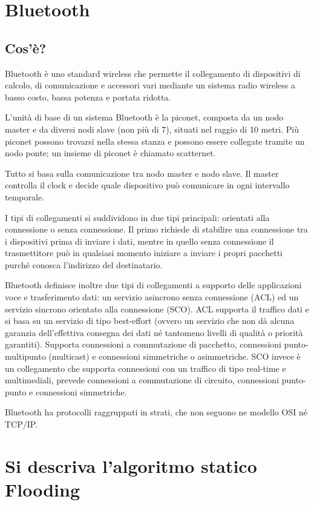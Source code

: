 \section{Bluetooth}
\subsection{Cos'è?}
Bluetooth è uno standard wireless che permette il collegamento di dispositivi di calcolo, di comunicazione e accessori vari mediante un sistema radio wireless a basso costo, bassa potenza e portata ridotta.

L'unità di base di un sistema Bluetooth è la piconet, composta da un nodo master e da diversi nodi slave (non più di 7), situati nel raggio di 10 metri. Più piconet possono trovarsi nella stessa stanza e possono essere collegate tramite un nodo ponte; un insieme di piconet è chiamato scatternet.

Tutto si basa sulla comunicazione tra nodo master e nodo slave. Il master controlla il clock e decide quale dispositivo può comunicare in ogni intervallo temporale.

I tipi di collegamenti si suddividono in due tipi principali: orientati alla connessione o senza connessione.
Il primo richiede di stabilire una connessione tra i dispositivi prima di inviare i dati, mentre in quello senza connessione il trasmettitore può in qualsiasi momento iniziare a inviare i propri pacchetti purché conosca l'indirizzo del destinatario.

Bluetooth definisce inoltre due tipi di collegamenti a supporto delle applicazioni voce e trasferimento dati: un servizio asincrono senza connessione (ACL) ed un servizio sincrono orientato alla connessione (SCO).
ACL supporta il traffico dati e si basa su un servizio di tipo best-effort (ovvero un servizio che non dà alcuna garanzia dell'effettiva consegna dei dati né tantomeno livelli di qualità o priorità garantiti).
Supporta connessioni a commutazione di pacchetto, connessioni punto-multipunto (multicast) e connessioni simmetriche o asimmetriche.
SCO invece è un collegamento che supporta connessioni con un traffico di tipo real-time e multimediali, prevede connessioni a commutazione di circuito, connessioni punto-punto e connessioni simmetriche.

Bluetooth ha protocolli raggruppati in strati, che non seguono ne modello OSI né TCP/IP.

\section{Si descriva l'algoritmo statico Flooding}

